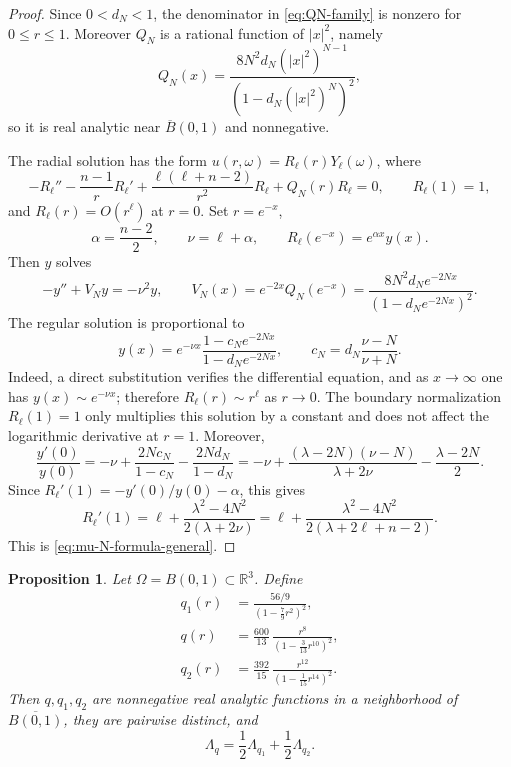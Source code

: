 \documentclass[11pt]{article}
\newcommand{\OmegaD}{\Omega}
\newcommand{\R}{\mathbb R}
\theoremstyle{plain}
\newtheorem{proposition}[theorem]{Proposition}
\theoremstyle{definition}
\theoremstyle{remark}
\begin{document}
\begin{proof}
Since $0<d_N<1$, the denominator in \eqref{eq:QN-family} is nonzero for $0\le r\le1$.  Moreover $Q_N$ is a rational function of $|x|^2$, namely
\[
  Q_N(x)=\frac{8N^2d_N(|x|^2)^{N-1}}{(1-d_N(|x|^2)^N)^2},
\]
so it is real analytic near $\overline B(0,1)$ and nonnegative.

The radial solution has the form $u(r,\omega)=R_\ell(r)Y_\ell(\omega)$, where
\[
 -R_\ell''-\frac{n-1}{r}R_\ell'
 +\frac{\ell(\ell+n-2)}{r^2}R_\ell+Q_N(r)R_\ell=0,
 \qquad R_\ell(1)=1,
\]
and $R_\ell(r)=O(r^\ell)$ at $r=0$.  Set $r=e^{-x}$,
\[
  \alpha=\frac{n-2}{2},
  \qquad
  \nu=\ell+\alpha,
  \qquad
  R_\ell(e^{-x})=e^{\alpha x}y(x).
\]
Then $y$ solves
\[
  -y''+V_Ny=-\nu^2y,
  \qquad
  V_N(x)=e^{-2x}Q_N(e^{-x})
  =\frac{8N^2d_Ne^{-2Nx}}{(1-d_Ne^{-2Nx})^2}.
\]
The regular solution is proportional to
\[
  y(x)=e^{-\nu x}
  \frac{1-c_Ne^{-2Nx}}{1-d_Ne^{-2Nx}},
  \qquad
  c_N=d_N\frac{\nu-N}{\nu+N}.
\]
Indeed, a direct substitution verifies the differential equation, and as $x\to\infty$ one has $y(x)\sim e^{-\nu x}$; therefore $R_\ell(r)\sim r^\ell$ as $r\to0$.  The boundary normalization $R_\ell(1)=1$ only multiplies this solution by a constant and does not affect the logarithmic derivative at $r=1$.  Moreover,
\[
  \frac{y'(0)}{y(0)}
  =-\nu+\frac{2Nc_N}{1-c_N}-\frac{2Nd_N}{1-d_N}
  =-\nu+\frac{(\lambda-2N)(\nu-N)}{\lambda+2\nu}
      -\frac{\lambda-2N}{2}.
\]
Since $R_\ell'(1)=-y'(0)/y(0)-\alpha$, this gives
\[
  R_\ell'(1)
  =\ell+\frac{\lambda^2-4N^2}{2(\lambda+2\nu)}
  =\ell+\frac{\lambda^2-4N^2}{2(\lambda+2\ell+n-2)}.
\]
This is \eqref{eq:mu-N-formula-general}.
\end{proof}

\begin{proposition}\label{prop:radial-schrodinger-counterexample}
Let $\OmegaD=B(0,1)\subset\R^3$.  Define
\begin{align*}
q_1(r)&=\frac{56/9}{\left(1-\frac79 r^2\right)^2},\\[3pt]
q(r)&=\frac{600}{13}\,\frac{r^8}{\left(1-\frac3{13}r^{10}\right)^2},\\[3pt]
q_2(r)&=\frac{392}{15}\,\frac{r^{12}}{\left(1-\frac1{15}r^{14}\right)^2}.
\end{align*}
Then $q,q_1,q_2$ are nonnegative real analytic functions in a neighborhood of $\overline{B(0,1)}$, they are pairwise distinct, and
\begin{equation}\label{eq:schrodinger-half-counterexample}
  \Lambda_q=\frac12\Lambda_{q_1}+\frac12\Lambda_{q_2}.
\end{equation}
\end{proposition}
\end{document}
